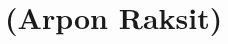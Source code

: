 \renewcommand{\thespeaker}{Arpon Raksit}
\renewcommand{\thetitle}{}
\section{\thetitle~(\thespeaker)}
\providecommand{\Supp}{\text{Supp}}


